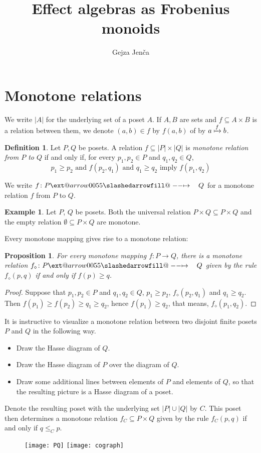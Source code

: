 \documentclass{article}
\title{Effect algebras as Frobenius monoids}
\author{Gejza Jenča}
\makeatletter
\newtheorem{proposition}[theorem]{Proposition}
\theoremstyle{definition}
\newtheorem{definition}[theorem]{Definition}
\newtheorem{example}[theorem]{Example}
\newcommand{\ladj}[1]{{#1}_\diamond}
\newcommand{\sto}{\xslashedrightarrow{\hskip 1pc}}
\def\slashedarrowfill@#1#2#3#4#5{%
  $\m@th\thickmuskip0mu\medmuskip\thickmuskip\thinmuskip\thickmuskip
  \relax#5#1\mkern-7mu%
  \cleaders\hbox{$#5\mkern-2mu#2\mkern-2mu$}\hfill
  \mathclap{#3}\mathclap{#2}%
  \cleaders\hbox{$#5\mkern-2mu#2\mkern-2mu$}\hfill
  \mkern-7mu#4$%
}
\def\rightslashedarrowfill@{%
  \slashedarrowfill@\relbar\relbar\mapstochar\rightarrow}
\newcommand\xslashedrightarrow[2][]{%
  \ext@arrow 0055{\rightslashedarrowfill@}{#1}{#2}}
\makeatother
\begin{document}
\maketitle
\section{Monotone relations}

We write $|A|$ for the underlying set of a poset $A$. If $A,B$ are sets
and $f\subseteq A\times B$ is a relation between them, we denote $(a,b)\in f$ by
$f(a,b)$ of by $a\xmapsto{f} b$.
\begin{definition}
Let $P,Q$ be posets. A relation $f\subseteq |P|\times |Q|$ is {\em monotone relation
from $P$ to $Q$}
if and only if, for every $p_1,p_2\in P$ and $q_1,q_2\in Q$,
$$
p_1\geq p_2\text{ and } f(p_2,q_1)\text{ and }q_1\geq q_2\text{ imply } f(p_1,q_2)
$$
\end{definition}
We write $f\colon P\sto Q$ for a monotone relation $f$ from $P$ to $Q$.
\begin{example}
Let $P$, $Q$ be posets. Both the universal 
relation $P\times Q\subseteq P\times Q$ and the empty relation $\emptyset\subseteq P\times
Q$ are monotone.
\end{example}

Every monotone mapping gives rise to a monotone relation:
\begin{proposition}
For every monotone mapping $f\colon P\to Q$, there is a monotone relation
$\ladj f\colon P\sto Q$ given by the rule $\ladj f(p,q)$ if and only if
$f(p)\geq q$.
\end{proposition}
\begin{proof}
Suppose that 
$p_1,p_2\in P$ and $q_1,q_2\in Q$, $p_1\geq p_2$, $\ladj f(p_2,q_1)$ and $q_1\geq
q_2$. Then 
$f(p_1)\geq f(p_2)\geq q_1\geq q_2$, hence $f(p_1)\geq q_2$, that means, $\ladj
f(p_1,q_2)$.
\end{proof}

It is instructive to visualize a monotone relation between two disjoint finite
posets $P$ and $Q$ in the following way.
\begin{itemize}
\item Draw the Hasse diagram of $Q$.
\item Draw the Hasse diagram of $P$ over the diagram of $Q$.
\item Draw some additional lines between elements of $P$ and elements of $Q$,
so that the resulting picture is a Hasse diagram of a poset.
\end{itemize}
Denote the resulting poset with the underlying
set $|P|\cup|Q|$ by $C$.
This poset then determines a monotone relation $f_C\subseteq P\times Q$ 
given by the rule $f_C(p,q)$ if and only if $q\leq_C p$.
\begin{figure}
\label{fig:PQ}
\begin{center}
\texttt{[image: PQ]}
\texttt{[image: cograph]}
\end{center}
\end{figure}
\end{document}
